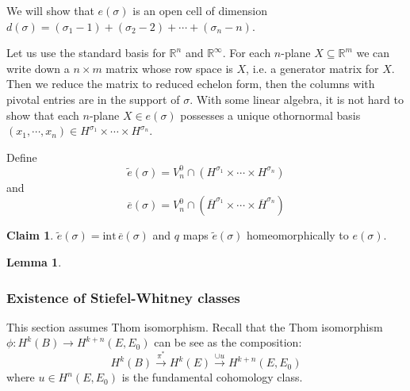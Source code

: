 \documentclass[12pt]{article}
\theoremstyle{plain}
\newtheorem{lemma}[equation]{Lemma}
\theoremstyle{definition}
\newtheorem*{claim}{Claim}
\newcommand{\IR}{\mathbb{R}}
\newcommand{\<}{\langle}
\renewcommand{\>}{\rangle}
\def\wt{\widetilde}
\newcommand{\wb}{\overline}
\begin{document}
We will show that $e(\sigma)$ is an open cell of dimension $d(\sigma) = (\sigma_1 - 1) + (\sigma_2 - 2) + \cdots + (\sigma_n - n)$.

Let us use the standard basis for $\IR^n$ and $\IR^\infty$. For each $n$-plane $X \subseteq \IR^m$ we can write down a $n \times m$ matrix whose row space is $X$, i.e. a generator matrix for $X$. Then we reduce the matrix to reduced echelon form, then the columns with pivotal entries are in the support of $\sigma$. With some linear algebra, it is not hard to show that each $n$-plane $X \in e(\sigma)$ possesses a unique othornormal basis $(x_1, \cdots, x_n) \in H^{\sigma_1} \times \cdots \times H^{\sigma_n}$. 

Define $$\wt{e}(\sigma) = V_n^0 \cap (H^{\sigma_1} \times \cdots \times H^{\sigma_n})$$ and $$ \wb{e}(\sigma) = V_n^0 \cap (\wb{H}^{\sigma_1} \times \cdots \times \wb{H}^{\sigma_n})$$

\begin{claim}
$\wt{e}(\sigma)  = \mathrm{int\,} \wb{e}(\sigma)$ and $q$ maps $\wt{e}(\sigma)$ homeomorphically to $e(\sigma)$.  
\end{claim}

\begin{lemma}
\end{lemma}

\subsubsection{Existence of Stiefel-Whitney classes}
This section assumes Thom isomorphism. Recall that the Thom isomorphism $\phi : H^k(B) \to H^{k + n} (E, E_0)$ can be see as the composition: 
$$ H^k(B) \stackrel{\pi^*}{\longrightarrow} H^k(E) \stackrel{\cup u}{\longrightarrow} H^{k + n}(E, E_0)$$ where $u \in H^n(E, E_0)$ is the fundamental cohomology class. 
\end{document}
